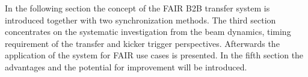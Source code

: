 In the following section the concept of the FAIR B2B transfer system is introduced together with two synchronization methods. The third section concentrates on the systematic investigation from the beam dynamics, timing requirement of the transfer and kicker trigger perspectives. Afterwards the application of the system for FAIR use cases is presented. In the fifth section the advantages and the potential for improvement will be introduced.



